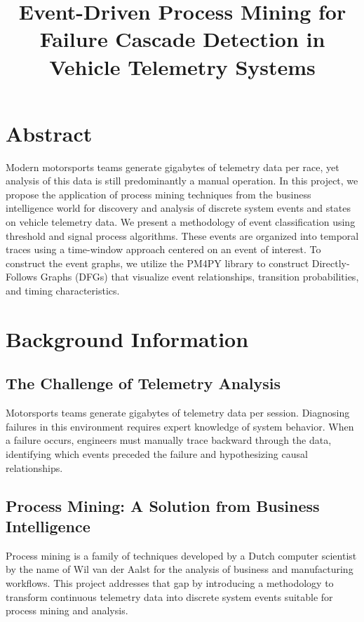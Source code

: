 \documentclass[14pt]{extarticle}
\title{Event-Driven Process Mining for Failure Cascade Detection in Vehicle Telemetry Systems}
\author{}
\date{}
\begin{document}
\maketitle

\section*{Abstract}

Modern motorsports teams generate gigabytes of telemetry data per race, yet analysis of this data is still predominantly a manual operation. In this project, we propose the application of process mining techniques from the business intelligence world for discovery and analysis of discrete system events and states on vehicle telemetry data. We present a methodology of event classification using threshold and signal process algorithms. These events are organized into temporal traces using a time-window approach centered on an event of interest. To construct the event graphs, we utilize the PM4PY library to construct Directly-Follows Graphs (DFGs) that visualize event relationships, transition probabilities, and timing characteristics.

\section{Background Information}

\subsection{The Challenge of Telemetry Analysis}

Motorsports teams generate gigabytes of telemetry data per session. Diagnosing failures in this environment requires expert knowledge of system behavior. When a failure occurs, engineers must manually trace backward through the data, identifying which events preceded the failure and hypothesizing causal relationships.

\subsection{Process Mining: A Solution from Business Intelligence}

Process mining is a family of techniques developed by a Dutch computer scientist by the name of Wil van der Aalst for the analysis of business and manufacturing workflows. This project addresses that gap by introducing a methodology to transform continuous telemetry data into discrete system events suitable for process mining and analysis.
\end{document}
